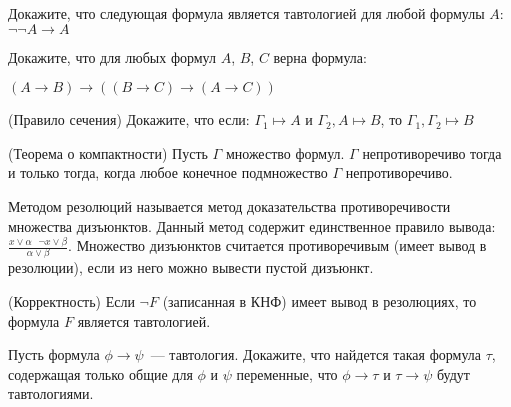 \setcounter{curtask}{1}


\begin{task}
    Докажите, что следующая формула является тавтологией для любой
    формулы $A$: $\neg\neg A \rightarrow A$
\end{task}

\begin{task}
    Докажите, что для любых формул $A$, $B$, $C$ верна формула:
    \begin{center}
        $(A \rightarrow B) \rightarrow ((B \rightarrow C) \rightarrow (A
	    \rightarrow C))$
    \end{center}
\end{task}

\begin{task} (Правило сечения)
    Докажите, что если: $\Gamma_1 \mapsto A$ и $\Gamma_2, A \mapsto
    B$, то $\Gamma_1, \Gamma_2 \mapsto B$
\end{task}

\begin{task} (Теорема о компактности)
    Пусть $\Gamma$ множество формул. $\Gamma$ непротиворечиво тогда и
    только тогда, когда любое конечное подмножество $\Gamma$ непротиворечиво.
\end{task}

\vspace{0.5cm}
Методом резолюций называется метод доказательства противоречивости
множества дизъюнктов. Данный метод содержит единственное правило
вывода: $\frac{x \vee \alpha \ \ \ \neg x \vee \beta}{\alpha \vee
  \beta}$. Множество дизъюнктов считается противоречивым (имеет вывод
в резолюции), если из него можно вывести пустой дизъюнкт.

\begin{task} (Корректность)
    Если $\neg F$ (записанная в КНФ) имеет вывод в резолюциях, то
    формула $F$ является тавтологией.
\end{task}

\begin{task}
    Пусть формула $\phi \rightarrow \psi$~--- тавтология. Докажите,
    что найдется такая формула $\tau$, содержащая только общие для
    $\phi$ и $\psi$ переменные, что $\phi \rightarrow \tau$ и
    $\tau \rightarrow \psi$ будут тавтологиями.
\end{task}